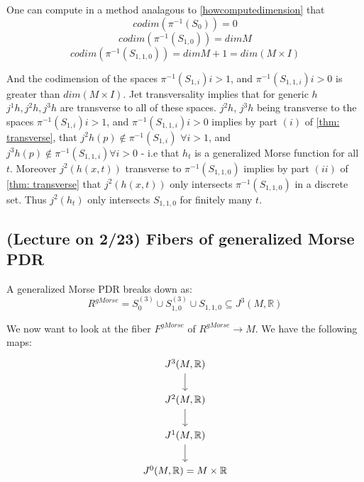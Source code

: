 \documentclass{article}
\newtheorem{proposed work}[theorem]{Proposed Work}
\begin{document}
One can compute in a method analagous to \ref{howcomputedimension} that 
\[codim (\pi^{-1}(S_{0}))=0 \]
\[codim (\pi^{-1}(S_{1,0}))=dim M \]
\[codim (\pi^{-1}(S_{1,1,0}))=dim M+1=dim(M \times I) \]
 
And the codimension of the spaces
$\pi^{-1}(S_{1,i}) i>1$, and $ \pi^{-1}(S_{1,1,i}) i>0$ is greater than $dim(M \times I)$.  Jet transversality implies that for generic $h$ $j^1h, j^2h, j^3h$ are transverse to all of these spaces.   $j^2h$, $j^3h$ being transverse to the spaces $\pi^{-1}(S_{1,i}) i>1$, and $ \pi^{-1}(S_{1,1,i}) i>0$  implies by part $(i)$ of \ref{thm: transverse}, that $j^2 h(p) \notin \pi^{-1}(S_{1,i})$ $\forall i>1$, and $j^3 h(p) \notin \pi^{-1}(S_{1,1,i}) \forall i>0$ - i.e that $h_t$ is a generalized Morse function for all $t$.   Moreover $j^2(h(x,t))$ transverse to $\pi^{-1}(S_{1,1,0})$ implies by part $(ii)$ of  \ref{thm: transverse} that $j^2(h(x,t))$ only intersects $\pi^{-1}(S_{1,1,0})$ in a discrete set.  Thus $j^2(h_t)$ only intersects $S_{1,1,0}$ for finitely many $t$.

\subsection{(Lecture on 2/23) Fibers of generalized Morse PDR}
A generalized Morse PDR breaks down as:
$$ R^{gMorse}=S_0^{(3)}\cup S_{1,0}^{(3)}\cup S_{1,1,0}\subseteq J^3(M, \mathbb{R})$$

We now want to look at the fiber $F^{gMorse}$ of $R^{gMorse}\to M$. We have the following maps:
\begin{equation*}
\begin{tikzcd}
J^3(M,\R)\arrow[d]\\
J^2(M,\R)\arrow[d]\\
J^1(M,\R)\arrow[d]\\
J^0(M,\R)=M\times \R
\end{tikzcd}
\end{equation*}
\end{document}
